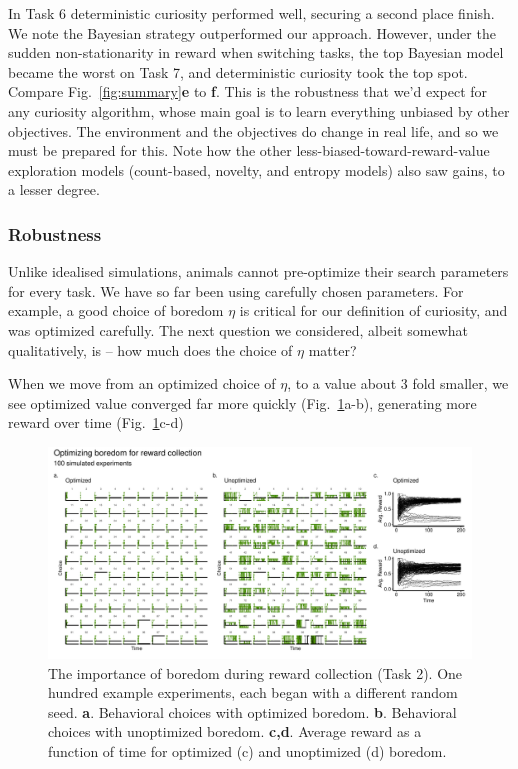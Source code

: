 In Task 6 deterministic curiosity performed well, securing a second place finish. We note the Bayesian strategy  outperformed our approach. However, under the sudden non-stationarity in reward when switching tasks, the top Bayesian model became the worst on Task 7, and deterministic curiosity took the top spot. Compare Fig.~\ref{fig:summary}\textbf{e} to \textbf{f}. This is the robustness that we'd expect for any curiosity algorithm, whose main goal is to learn everything unbiased by other objectives. The environment and the objectives do change in real life, and so we must be prepared for this. Note how the other less-biased-toward-reward-value exploration models (count-based, novelty, and entropy models) also saw gains, to a lesser degree.

\subsubsection*{Robustness}
Unlike idealised simulations, animals cannot pre-optimize their search parameters for every task. We have so far been using carefully chosen parameters. For example, a good choice of boredom $\eta$ is critical for our definition of curiosity, and was optimized carefully. The next question we considered, albeit somewhat qualitatively, is -- how much does the choice of $\eta$ matter? 

When we move from an optimized choice of $\eta$, to a value about 3 fold smaller, we see optimized value converged far more quickly (Fig.~\ref{fig:boredom2}a-b), generating more reward over time (Fig.~\ref{fig:boredom2}c-d)

\begin{figure}
    \label{fig:summary} 
	\includegraphics[width=11.4cm]{img/boredom2.pdf} 
	\caption{The importance of boredom during reward collection (Task 2). One hundred example experiments, each began with a different random seed. 
	\textbf{a}. Behavioral choices with optimized boredom.
	\textbf{b}. Behavioral choices with unoptimized boredom.
	\textbf{c,d}. Average reward as a function of time for optimized (c) and unoptimized (d) boredom.
	}
	\label{fig:boredom2} 
\end{figure}

